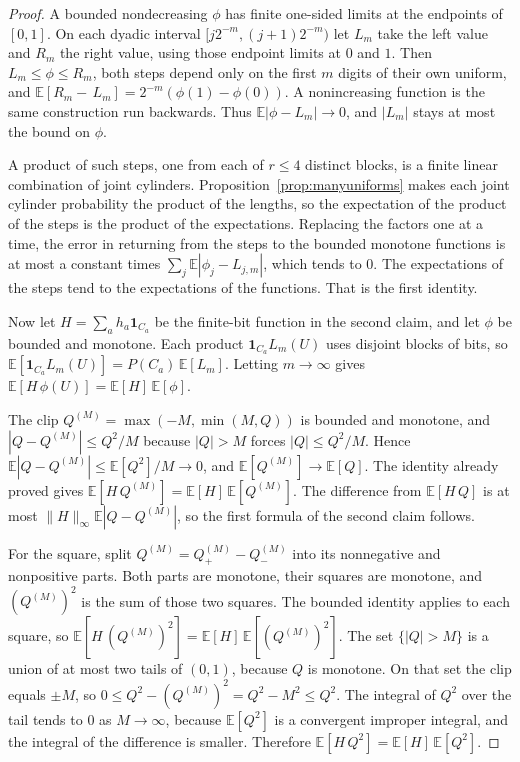 \begin{proof}
A bounded nondecreasing $\phi$ has finite one-sided limits at the endpoints of $[0,1]$. On each dyadic interval $[j2^{-m},(j+1)2^{-m})$ let $L_m$ take the left value and $R_m$ the right value, using those endpoint limits at $0$ and $1$. Then $L_m\le\phi\le R_m$, both steps depend only on the first $m$ digits of their own uniform, and $\mathbb E[R_m-\,L_m]=2^{-m}(\phi(1)-\phi(0))$. A nonincreasing function is the same construction run backwards. Thus $\mathbb E|\phi-L_m|\to0$, and $|L_m|$ stays at most the bound on $\phi$.

A product of such steps, one from each of $r\le4$ distinct blocks, is a finite linear combination of joint cylinders. Proposition~\ref{prop:manyuniforms} makes each joint cylinder probability the product of the lengths, so the expectation of the product of the steps is the product of the expectations. Replacing the factors one at a time, the error in returning from the steps to the bounded monotone functions is at most a constant times $\sum_j\mathbb E|\phi_j-L_{j,m}|$, which tends to $0$. The expectations of the steps tend to the expectations of the functions. That is the first identity.

Now let $H=\sum_a h_a\mathbf 1_{C_a}$ be the finite-bit function in the second claim, and let $\phi$ be bounded and monotone. Each product $\mathbf 1_{C_a}L_m(U)$ uses disjoint blocks of bits, so $\mathbb E[\mathbf 1_{C_a}L_m(U)]=P(C_a)\,\mathbb E[L_m]$. Letting $m\to\infty$ gives $\mathbb E[H\,\phi(U)]=\mathbb E[H]\,\mathbb E[\phi]$.

The clip $Q^{(M)}=\max(-M,\min(M,Q))$ is bounded and monotone, and $|Q-Q^{(M)}|\le Q^2/M$ because $|Q|>M$ forces $|Q|\le Q^2/M$. Hence $\mathbb E|Q-Q^{(M)}|\le\mathbb E[Q^2]/M\to0$, and $\mathbb E[Q^{(M)}]\to\mathbb E[Q]$. The identity already proved gives $\mathbb E[H\,Q^{(M)}]=\mathbb E[H]\,\mathbb E[Q^{(M)}]$. The difference from $\mathbb E[H\,Q]$ is at most $\|H\|_\infty\mathbb E|Q-Q^{(M)}|$, so the first formula of the second claim follows.

For the square, split $Q^{(M)}=Q^{(M)}_+-Q^{(M)}_-$ into its nonnegative and nonpositive parts. Both parts are monotone, their squares are monotone, and $(Q^{(M)})^2$ is the sum of those two squares. The bounded identity applies to each square, so $\mathbb E[H\,(Q^{(M)})^2]=\mathbb E[H]\,\mathbb E[(Q^{(M)})^2]$. The set $\{|Q|>M\}$ is a union of at most two tails of $(0,1)$, because $Q$ is monotone. On that set the clip equals $\pm M$, so $0\le Q^2-(Q^{(M)})^2=Q^2-M^2\le Q^2$. The integral of $Q^2$ over the tail tends to $0$ as $M\to\infty$, because $\mathbb E[Q^2]$ is a convergent improper integral, and the integral of the difference is smaller. Therefore $\mathbb E[H\,Q^2]=\mathbb E[H]\,\mathbb E[Q^2]$.


\end{proof}
